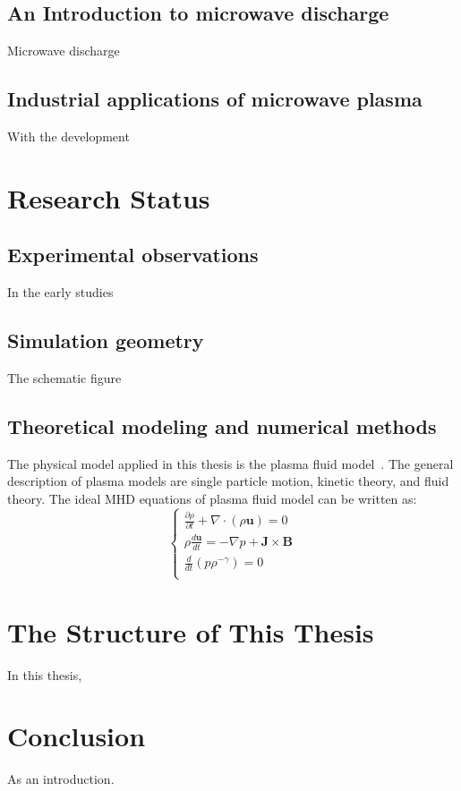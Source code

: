 \subsection{An Introduction to microwave discharge}
Microwave discharge 


\subsection{Industrial applications of microwave plasma}
With the development 

\section{Research Status}
\subsection{Experimental observations}
In the early studies 

\subsection{Simulation geometry}
The schematic figure

\subsection{Theoretical modeling and numerical methods}
The physical model applied in this thesis is the plasma fluid model~\cite{chen1986plasma,lieberman2005,chen2013}. The general description of plasma models are single particle motion, kinetic theory, and fluid theory. The ideal MHD equations of plasma fluid model can be written as:
\begin{equation}\label{intro:eq:14}
\left\{
        \begin{array}{lr}
         \frac{\partial\rho}{\partial t} + \nabla\cdot(\rho\mathbf{u}) = 0\\
          \rho\frac{d\mathbf{u}}{dt} = -\nabla p + \mathbf{J}\times\mathbf{B}\\
          \frac{d}{dt}(p\rho^{-\gamma}) = 0\\
        \end{array}
\right.
\end{equation}

\section{The Structure of This Thesis}
In this thesis, 

\section{Conclusion}
As an introduction.